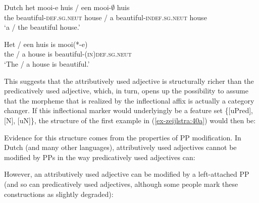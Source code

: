 \documentclass[output=paper
,modfonts
,nonflat]{langsci/langscibook}
\begin{document}
\begin{exe}
\ex Dutch \label{ex-zeijlstra:40}
	\xlist
	\ex \label{ex-zeijlstra:40a}
	\gll het mooi-e huis \textup{/} een mooi-$\emptyset$ huis \\
	the beautiful-\textsc{def.sg.neut} house  / 
	a beautiful-\textsc{indef.sg.neut} house \\ \vspace{-1cm}
	\glt `a / the beautiful house.'    
	 
	\ex
	\gll Het \textup{/} een huis is mooi(*-e)\\
	the / a house is beautiful-(\textsc{in})\textsc{def.sg.neut}    \\
	\glt `The / a house is beautiful.' 
	\endxlist
\end{exe}  
This suggests that the attributively used adjective is structurally richer than the predicatively used adjective, which, in turn, opens up the possibility to assume that the morpheme that is realized by the inflectional affix is actually a category changer. If this inflectional marker would underlyingly be a feature set \{[uPred], [N], [uN]\}, the structure of the first example in (\ref{ex-zeijlstra:40a}) would then be:

\begin{figure}[!h]
	\begin{exe}
	\end{exe} \vspace{-0.8cm}
\end{figure}
\noindent Evidence for this structure comes from the properties of PP modification. In Dutch (and many other languages), attributively used adjectives cannot be modified by PPs in the way predicatively used adjectives can:

However, an attributively used adjective can be modified by a left-attached PP (and so can predicatively used adjectives, although some people mark these constructions as slightly degraded):
\end{document}
